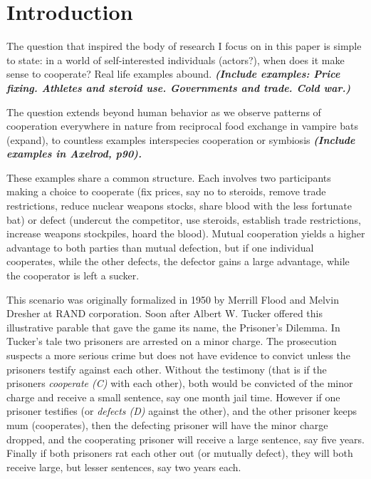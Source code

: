 

\chapter{Introduction}
The question that inspired the body of research I focus on in this paper is simple to state: in a world of self-interested individuals (actors?), when does it make sense to cooperate?  Real life examples abound. \textit{\textbf{(Include examples: Price fixing. Athletes and steroid use. Governments and trade. Cold war.)}}

The question extends beyond human behavior as we observe patterns of cooperation everywhere in nature from reciprocal food exchange in vampire bats (expand), to countless examples interspecies cooperation or symbiosis \textit{\textbf{(Include examples in Axelrod, p90).}}

These examples share a common structure. Each involves two participants making a choice to cooperate (fix prices, say no to steroids, remove trade restrictions, reduce nuclear weapons stocks, share blood with the less fortunate bat) or defect (undercut the competitor, use steroids, establish trade restrictions, increase weapons stockpiles, hoard the blood). Mutual cooperation yields a higher advantage to both parties than mutual defection, but if one individual cooperates, while the other defects, the defector gains a large advantage, while the cooperator is left a sucker.

This scenario was originally formalized in 1950 by Merrill Flood and Melvin Dresher at RAND corporation. Soon after Albert W. Tucker offered this illustrative parable that gave the game its name, the Prisoner's Dilemma. In Tucker's tale two prisoners are arrested on a minor charge. The prosecution suspects a more serious crime but does not have evidence to convict unless the prisoners testify against each other. Without the testimony (that is if the prisoners \textit{cooperate (C)} with each other), both would be convicted of the minor charge and receive a small sentence, say one month jail time. However if one prisoner testifies (or \textit{defects (D)} against the other), and the other prisoner keeps mum (cooperates), then the defecting prisoner will have the minor charge dropped, and the cooperating prisoner will receive a large sentence, say five years. Finally if both prisoners rat each other out (or mutually defect), they will both receive large, but lesser sentences, say two years each.


